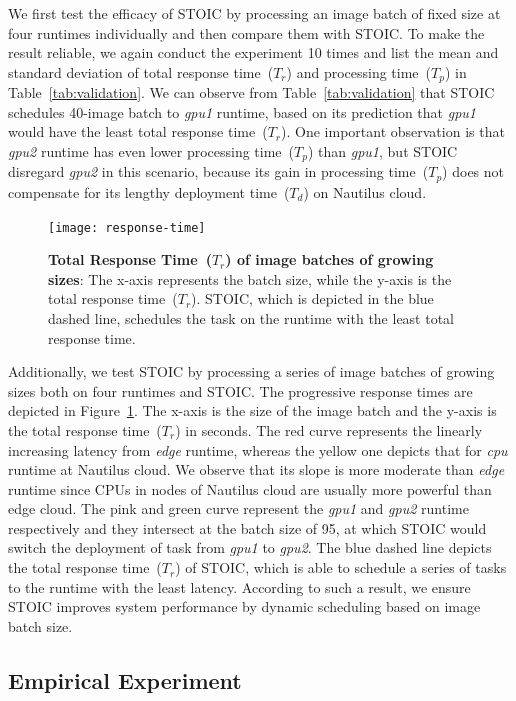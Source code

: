We first test the efficacy of STOIC by processing an image batch of fixed size at four runtimes individually and then compare them with STOIC. To make the result reliable, we again conduct the experiment 10 times and list the mean and standard deviation of total response time~($T_r$) and processing time~($T_p$) in Table~\ref{tab:validation}. We can observe from Table~\ref{tab:validation} that STOIC schedules 40-image batch to \textit{gpu1} runtime, based on its prediction that  \textit{gpu1} would have the least total response time~($T_r$). One important observation is that \textit{gpu2} runtime has even lower processing time~($T_p$) than \textit{gpu1}, but STOIC disregard \textit{gpu2} in this scenario, because its gain in processing time~($T_p$) does not compensate for its lengthy deployment time~($T_d$) on Nautilus cloud.

\begin{figure}[t] \centering 
\texttt{[image: response-time]}
\caption{\textbf{Total Response Time~($T_r$) of image batches of growing sizes}: The x-axis represents the batch size, while the y-axis is the total response time~($T_r$). STOIC, which is depicted in the blue dashed line, schedules the task on the runtime with the least total response time.  
\label{fig:response-time}}
\end{figure}

Additionally, we test STOIC by processing a series of image batches of growing sizes both on four runtimes and STOIC. The progressive response times are depicted in Figure~\ref{fig:response-time}. The x-axis is the size of the image batch and the y-axis is the total response time~($T_r$) in seconds. The red curve represents the linearly increasing latency from \textit{edge} runtime, whereas the yellow one depicts that for \textit{cpu} runtime at Nautilus cloud. We observe that its slope is more moderate than \textit{edge} runtime since CPUs in nodes of Nautilus cloud are usually more powerful than edge cloud. The pink and green curve represent the \textit{gpu1} and \textit{gpu2} runtime respectively and they intersect at the batch size of 95, at which STOIC would switch the deployment of task from \textit{gpu1} to \textit{gpu2}. The blue dashed line depicts the total response time~($T_r$) of STOIC, which is able to schedule a series of tasks to the runtime with the least latency. According to such a result, we ensure STOIC improves system performance by dynamic scheduling based on image batch size.


\subsection{Empirical Experiment}


